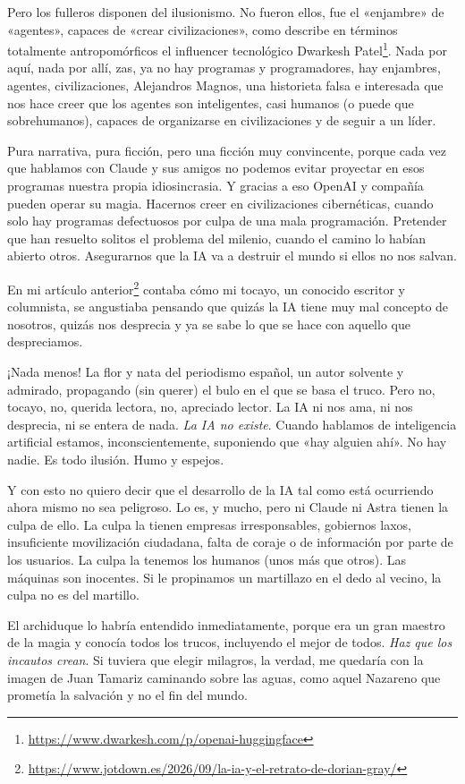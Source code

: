 \documentclass[11pt,a4paper]{article}
\begin{document}
Pero los fulleros disponen del ilusionismo. No fueron ellos, fue el «enjambre» de «agentes», capaces de «crear civilizaciones», como describe en términos totalmente antropomórficos el influencer tecnológico Dwarkesh Patel\footnote{\url{https://www.dwarkesh.com/p/openai-huggingface}}. Nada por aquí, nada por allí, zas, ya no hay programas y programadores, hay enjambres, agentes, civilizaciones, Alejandros Magnos, una historieta falsa e interesada que nos hace creer que los agentes son inteligentes, casi humanos (o puede que sobrehumanos), capaces de organizarse en civilizaciones y de seguir a un líder.

Pura narrativa, pura ficción, pero una ficción muy convincente, porque cada vez que hablamos con Claude y sus amigos no podemos evitar proyectar en esos programas nuestra propia idiosincrasia. Y gracias a eso OpenAI y compañía pueden operar su magia. Hacernos creer en civilizaciones cibernéticas, cuando solo hay programas defectuosos por culpa de una mala programación. Pretender que han resuelto solitos el problema del milenio, cuando el camino lo habían abierto otros. Asegurarnos que la IA va a destruir el mundo si ellos no nos salvan.

En mi artículo anterior\footnote{\url{https://www.jotdown.es/2026/09/la-ia-y-el-retrato-de-dorian-gray/}} contaba cómo mi tocayo, un conocido escritor y columnista, se angustiaba pensando que quizás la IA tiene muy mal concepto de nosotros, quizás nos desprecia y ya se sabe lo que se hace con aquello que despreciamos.

¡Nada menos! La flor y nata del periodismo español, un autor solvente y admirado, propagando (sin querer) el bulo en el que se basa el truco. Pero no, tocayo, no, querida lectora, no, apreciado lector. La IA ni nos ama, ni nos desprecia, ni se entera de nada. \emph{La IA no existe}. Cuando hablamos de inteligencia artificial estamos, inconscientemente, suponiendo que «hay alguien ahí». No hay nadie. Es todo ilusión. Humo y espejos.

Y con esto no quiero decir que el desarrollo de la IA tal como está ocurriendo ahora mismo no sea peligroso. Lo es, y mucho, pero ni Claude ni Astra tienen la culpa de ello. La culpa la tienen empresas irresponsables, gobiernos laxos, insuficiente movilización ciudadana, falta de coraje o de información por parte de los usuarios. La culpa la tenemos los humanos (unos más que otros). Las máquinas son inocentes. Si le propinamos un martillazo en el dedo al vecino, la culpa no es del martillo.

El archiduque lo habría entendido inmediatamente, porque era un gran maestro de la magia y conocía todos los trucos, incluyendo el mejor de todos. \emph{Haz que los incautos crean}. Si tuviera que elegir milagros, la verdad, me quedaría con la imagen de Juan Tamariz caminando sobre las aguas, como aquel Nazareno que prometía la salvación y no el fin del mundo.
\end{document}
